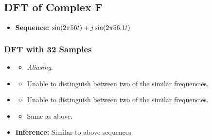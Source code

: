 \documentclass[../../course]{subfiles}
\begin{document}
\pagebreak

\subsection{DFT of Complex F} \label{ssec:dftCplxF}

\begin{itemize} [label=]

    \item \textbf{Sequence:} $\sin(2 \pi 56 t) + j \sin(2 \pi 56.1 t)$

\end{itemize}

\subsubsection{DFT with 32 Samples}

\begin{itemize} [label=]

    \item \sampFreqMuchLess
        \begin{itemize} [label=]
            \item \emph{Aliasing}.
        \end{itemize}

    \item \sampFreqNorm
        \begin{itemize} [label=]
            \item Unable to distinguish between two of the similar frequencies.
        \end{itemize}

    \item \sampFreqSligGreat
        \begin{itemize} [label=]
            \item Unable to distinguish between two of the similar frequencies.
        \end{itemize}

    \item \sampFreqMuchGreat
        \begin{itemize} [label=]
            \item Same as above.
        \end{itemize}

    \item \textbf{Inference:} Similar to above sequences.

\end{itemize}
\end{document}
